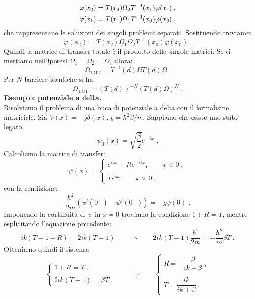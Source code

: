 \documentclass[12pt,a4paper]{report}
\theoremstyle{definition}
\numberwithin{equation}{section}
\begin{document}
\begin{align}
\varphi(x_2) &= T(x_2)\Omega_2 T^{-1}(x_1)\varphi(x_1)\;, \notag \\
\varphi(x_1) &= T(x_1)\Omega_1 T^{-1}(x_0)\varphi(x_0)\;,
\end{align}
che rappresentano le soluzioni dei singoli problemi separati. Sostituendo troviamo:
\begin{equation}
\varphi(x_2)=T(x_2)\Omega_1\Omega_2 T^{-1}(x_0)\varphi(x_0)\;.
\end{equation}
Quindi la matrice di transfer totale è il prodotto delle singole matrici. Se ci mettiamo nell'ipotesi $\Omega_1=\Omega_2=\Omega$, allora:
$$
\Omega_{\mathrm{TOT}}=T^{-1}(d)\Omega T(d)\Omega\;.
$$
Per $N$ barriere identiche si ha:
\begin{equation}
\Omega_{\mathrm{TOT}}=(T(d))^{-N}(T(d)\Omega)^N\;.
\end{equation}
\textbf{Esempio: potenziale a delta.} \\
Risolviamo il problema di una buca di potenziale a delta con il formalismo matriciale. Sia $V(x)=-g\delta(x)$, $g=\hbar^2 \beta/m$. Sappiamo che esiste uno stato legato:
\begin{equation}
\psi_0(x)=\sqrt{\frac{\beta}{2}}e^{-\beta x}\;.
\end{equation}
Calcoliamo la matrice di transfer:
\begin{equation}
\psi(x)=\begin{cases}
e^{ikx}+Re^{-ikx}, \qquad x<0\;, \\
\\
Te^{ikx} \qquad x>0\;,
\end{cases}
\end{equation}
con la condizione:
\begin{equation}
\frac{\hbar^2}{2m}(\psi'(0^+)-\psi'(0^-))=-g\psi(0)\;.
\end{equation}
Imponendo la continuità di $\psi$ in $x=0$ troviamo la condizione $1+R=T$, mentre esplicitando l'equazione precedente:
\begin{equation}
ik(T-1+R)=2ik(T-1) \qquad \Longrightarrow \qquad 2ik(T-1)\frac{\hbar^2}{2m}=-\frac{\hbar^2}{m}\beta T\;.
\end{equation}
Otteniamo quindi il sistema:
\begin{equation}
\begin{cases}
1+R=T\;, \\
\\
2ik(T-1)=\beta T\;,
\end{cases} \qquad \Longrightarrow \qquad 
\begin{cases}
R=-\dfrac{\beta}{ik+\beta}\;, \\
\\
T=\dfrac{ik}{ik+\beta}\;.
\end{cases}
\end{equation}
\end{document}

